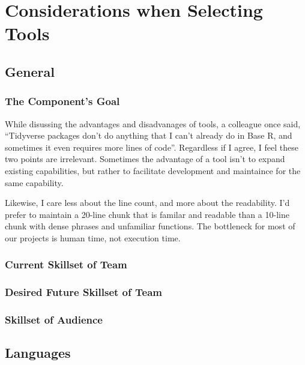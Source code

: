 \documentclass[]{book}
\begin{document}
\hypertarget{tools}{%
\chapter{Considerations when Selecting Tools}\label{tools}}

\hypertarget{general}{%
\section{General}\label{general}}

\hypertarget{the-components-goal}{%
\subsection{The Component's Goal}\label{the-components-goal}}

While disussing the advantages and disadvanages of tools, a colleague once said, ``Tidyverse packages don't do anything that I can't already do in Base R, and sometimes it even requires more lines of code''. Regardless if I agree, I feel these two points are irrelevant. Sometimes the advantage of a tool isn't to expand existing capabilities, but rather to facilitate development and maintaince for the same capability.

Likewise, I care less about the line count, and more about the readability. I'd prefer to maintain a 20-line chunk that is familar and readable than a 10-line chunk with dense phrases and unfamiliar functions. The bottleneck for most of our projects is human time, not execution time.

\hypertarget{current-skillset-of-team}{%
\subsection{Current Skillset of Team}\label{current-skillset-of-team}}

\hypertarget{desired-future-skillset-of-team}{%
\subsection{Desired Future Skillset of Team}\label{desired-future-skillset-of-team}}

\hypertarget{skillset-of-audience}{%
\subsection{Skillset of Audience}\label{skillset-of-audience}}

\hypertarget{languages}{%
\section{Languages}\label{languages}}
\end{document}
